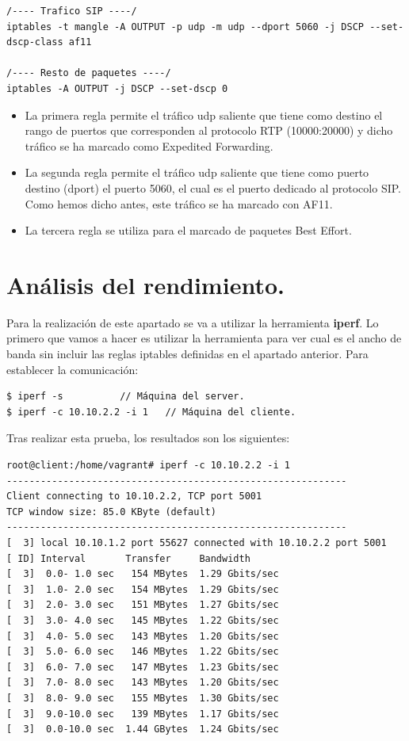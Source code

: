 \documentclass[11pt]{article}
\begin{document}
\begin{itemize}
\begin{lstlisting}[style=C,numbers=none]
/---- Trafico SIP ----/
iptables -t mangle -A OUTPUT -p udp -m udp --dport 5060 -j DSCP --set-dscp-class af11

/---- Resto de paquetes ----/
iptables -A OUTPUT -j DSCP --set-dscp 0
\end{lstlisting}
\begin{itemize}

\item La primera regla permite el tráfico udp saliente que tiene como destino el rango de puertos que corresponden al protocolo RTP (10000:20000) y dicho tráfico se ha marcado como Expedited Forwarding.


\item La segunda regla permite el tráfico udp saliente que tiene como puerto destino (dport) el puerto 5060, el cual es el puerto dedicado al protocolo SIP. Como hemos dicho antes, este tráfico se ha marcado con AF11.


\item La tercera regla se utiliza para el marcado de paquetes Best Effort.

\end{itemize}


\end{itemize}
\newpage

\section{Análisis del rendimiento.}
Para la realización de este apartado se va a utilizar la herramienta \textbf{iperf}. Lo primero que vamos a hacer es utilizar la herramienta para ver cual es el ancho de banda sin incluir las reglas iptables definidas en el apartado anterior. Para establecer la comunicación:
\begin{lstlisting}[style=C,numbers=none]
$ iperf -s 			// Máquina del server.
$ iperf -c 10.10.2.2 -i 1	// Máquina del cliente.
\end{lstlisting}

Tras realizar esta prueba, los resultados son los siguientes:

\begin{lstlisting}[style=C,numbers=none]
root@client:/home/vagrant# iperf -c 10.10.2.2 -i 1
------------------------------------------------------------
Client connecting to 10.10.2.2, TCP port 5001
TCP window size: 85.0 KByte (default)
------------------------------------------------------------
[  3] local 10.10.1.2 port 55627 connected with 10.10.2.2 port 5001
[ ID] Interval       Transfer     Bandwidth
[  3]  0.0- 1.0 sec   154 MBytes  1.29 Gbits/sec
[  3]  1.0- 2.0 sec   154 MBytes  1.29 Gbits/sec
[  3]  2.0- 3.0 sec   151 MBytes  1.27 Gbits/sec
[  3]  3.0- 4.0 sec   145 MBytes  1.22 Gbits/sec
[  3]  4.0- 5.0 sec   143 MBytes  1.20 Gbits/sec
[  3]  5.0- 6.0 sec   146 MBytes  1.22 Gbits/sec
[  3]  6.0- 7.0 sec   147 MBytes  1.23 Gbits/sec
[  3]  7.0- 8.0 sec   143 MBytes  1.20 Gbits/sec
[  3]  8.0- 9.0 sec   155 MBytes  1.30 Gbits/sec
[  3]  9.0-10.0 sec   139 MBytes  1.17 Gbits/sec
[  3]  0.0-10.0 sec  1.44 GBytes  1.24 Gbits/sec
\end{lstlisting}
\end{document}
